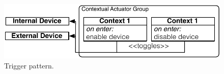 \begin{figure}
\begin{center}
\includegraphics[scale=.43]{imgs/con_act}
\vspace{-1mm}
\caption{Trigger pattern.}
  \label{fig:trigger}
\vspace{-8mm}
\end{center}
\end{figure}


